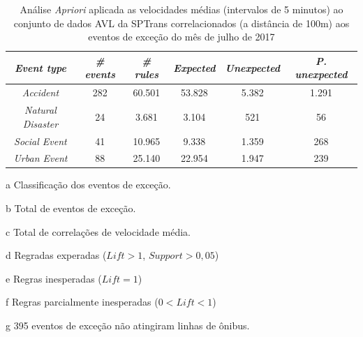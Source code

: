 \documentclass[
	12pt,				%
	oneside,			%
	a4paper,			%
	english,			%
	brazil				%
	]{abntex2ppgsi}
\begin{document}
\begin{apendicesenv}
\begin{table}[!htb]
\centering
\begin{threeparttable}
\caption {Análise \textit{Apriori} aplicada as velocidades médias (intervalos de 5 minutos) ao conjunto de dados AVL da SPTrans correlacionados (a distância de 100m) aos eventos de exceção do mês de julho de 2017}
\label {tab:aprioriFull}
\begin{tabular}{c|c|c|c|c|c}
\hline
\textbf{\textit{Event type}}\tnote{a} & \textbf{\textit{\# events}}\tnote{b} & \textit{\textbf{\# rules}}\tnote{c} & \textbf{\textit{Expected}}\tnote{d} & \textbf{\textit{Unexpected}}\tnote{e} & \textbf{\textit{P. unexpected}}\tnote{f}   \\
\hline
\textit{Accident} & 282 & 60.501 & 53.828 & 5.382 & 1.291 \\
\textit{Natural Disaster} & 24 & 3.681 & 3.104 & 521 & 56 \\
\textit{Social Event} & 41 & 10.965 & 9.338 & 1.359 & 268 \\
\textit{Urban Event} & 88 & 25.140 & 22.954 & 1.947 & 239 \\
\hline
\end{tabular}
\begin{tablenotes}
            \item[a] Classificação dos eventos de exceção.
            \item[b] Total de eventos de exceção.
            \item[c] Total de correlações de velocidade média.
            \item[d] Regradas experadas ($Lift > 1$, $Support > 0,05$)
            \item[e] Regras inesperadas ($Lift = 1$)
            \item[f] Regras parcialmente inesperadas ($0 < Lift < 1$)
            \item[g] 395 eventos de exceção não atingiram linhas de ônibus.
        \end{tablenotes}
\end{threeparttable}
\end{table}



\end{apendicesenv}
\end{document}
